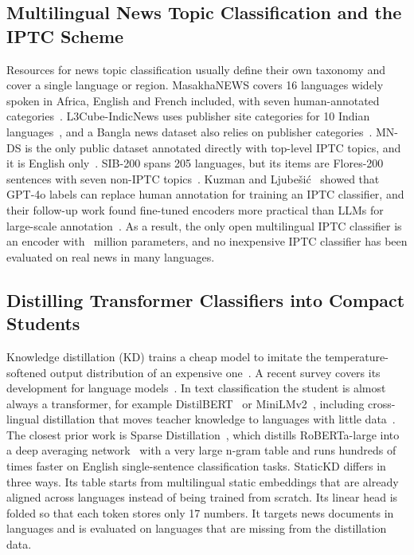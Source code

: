 \subsection{Multilingual News Topic Classification and the IPTC Scheme}
Resources for news topic classification usually define their own taxonomy and cover a single language or region. MasakhaNEWS covers 16 languages widely spoken in Africa, English and French included, with seven human-annotated categories~\cite{adelani2023masakhanews}. L3Cube-IndicNews uses publisher site categories for 10 Indian languages~\cite{mirashi2023indicnews}, and a Bangla news dataset also relies on publisher categories~\cite{hossain2025banglanews}. MN-DS is the only public dataset annotated directly with top-level IPTC topics, and it is English only~\cite{petukhova2023mnds}. SIB-200 spans 205 languages, but its items are Flores-200 sentences with seven non-IPTC topics~\cite{adelani2024sib200}. Kuzman and Ljube\v{s}i\'c~\cite{kuzman2025llm} showed that GPT-4o labels can replace human annotation for training an IPTC classifier, and their follow-up work found fine-tuned encoders more practical than LLMs for large-scale annotation~\cite{kuzman2025southslavic}. As a result, the only open multilingual IPTC classifier is an encoder with ~million parameters, and no inexpensive IPTC classifier has been evaluated on real news in many languages.

\subsection{Distilling Transformer Classifiers into Compact Students}
Knowledge distillation (KD) trains a cheap model to imitate the temperature-softened output distribution of an expensive one~\cite{hinton2015distilling}. A recent survey covers its development for language models~\cite{yang2025kdsurvey}. In text classification the student is almost always a transformer, for example DistilBERT~\cite{sanh2019distilbert} or MiniLMv2~\cite{wang2021minilmv2}, including cross-lingual distillation that moves teacher knowledge to languages with little data~\cite{piperno2025crosslingual}. The closest prior work is Sparse Distillation~\cite{ye2022sparse}, which distills RoBERTa-large into a deep averaging network~\cite{iyyer2015dan} with a very large n-gram table and runs hundreds of times faster on English single-sentence classification tasks. StaticKD differs in three ways. Its table starts from multilingual static embeddings that are already aligned across languages instead of being trained from scratch. Its linear head is folded so that each token stores only 17 numbers. It targets news documents in  languages and is evaluated on languages that are missing from the distillation data.
